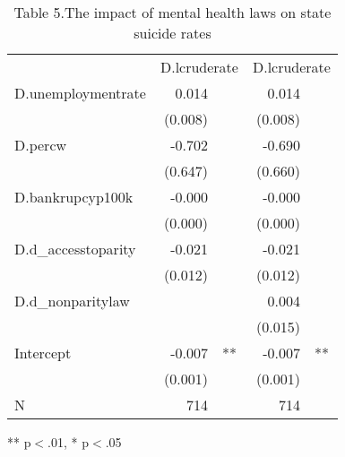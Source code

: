 \documentclass{article}
\begin{document}
\begin{table}[!h]
\caption{Table 5.The impact of mental health laws on state suicide rates}
\centering
\begin{tabular}{lllll}
\cline{1-5}
\multicolumn{1}{r}{} &
  \multicolumn{2}{c}{D.lcruderate} &
  \multicolumn{2}{c}{D.lcruderate} \\
\cline{1-5}
\multicolumn{1}{l}{D.unemploymentrate} &
  \multicolumn{1}{r}{0.014} &
  \multicolumn{1}{l}{} &
  \multicolumn{1}{r}{0.014} &
  \multicolumn{1}{l}{} \\
\multicolumn{1}{l}{} &
  \multicolumn{1}{r}{(0.008)} &
  \multicolumn{1}{l}{} &
  \multicolumn{1}{r}{(0.008)} &
  \multicolumn{1}{l}{} \\
\multicolumn{1}{l}{D.percw} &
  \multicolumn{1}{r}{-0.702} &
  \multicolumn{1}{l}{} &
  \multicolumn{1}{r}{-0.690} &
  \multicolumn{1}{l}{} \\
\multicolumn{1}{l}{} &
  \multicolumn{1}{r}{(0.647)} &
  \multicolumn{1}{l}{} &
  \multicolumn{1}{r}{(0.660)} &
  \multicolumn{1}{l}{} \\
\multicolumn{1}{l}{D.bankrupcyp100k} &
  \multicolumn{1}{r}{-0.000} &
  \multicolumn{1}{l}{} &
  \multicolumn{1}{r}{-0.000} &
  \multicolumn{1}{l}{} \\
\multicolumn{1}{l}{} &
  \multicolumn{1}{r}{(0.000)} &
  \multicolumn{1}{l}{} &
  \multicolumn{1}{r}{(0.000)} &
  \multicolumn{1}{l}{} \\
\multicolumn{1}{l}{D.d\_accesstoparity} &
  \multicolumn{1}{r}{-0.021} &
  \multicolumn{1}{l}{} &
  \multicolumn{1}{r}{-0.021} &
  \multicolumn{1}{l}{} \\
\multicolumn{1}{l}{} &
  \multicolumn{1}{r}{(0.012)} &
  \multicolumn{1}{l}{} &
  \multicolumn{1}{r}{(0.012)} &
  \multicolumn{1}{l}{} \\
\multicolumn{1}{l}{D.d\_nonparitylaw} &
  \multicolumn{1}{r}{} &
  \multicolumn{1}{l}{} &
  \multicolumn{1}{r}{0.004} &
  \multicolumn{1}{l}{} \\
\multicolumn{1}{l}{} &
  \multicolumn{1}{r}{} &
  \multicolumn{1}{l}{} &
  \multicolumn{1}{r}{(0.015)} &
  \multicolumn{1}{l}{} \\
\multicolumn{1}{l}{Intercept} &
  \multicolumn{1}{r}{-0.007} &
  \multicolumn{1}{l}{**} &
  \multicolumn{1}{r}{-0.007} &
  \multicolumn{1}{l}{**} \\
\multicolumn{1}{l}{} &
  \multicolumn{1}{r}{(0.001)} &
  \multicolumn{1}{l}{} &
  \multicolumn{1}{r}{(0.001)} &
  \multicolumn{1}{l}{} \\
\multicolumn{1}{l}{N} &
  \multicolumn{1}{r}{714} &
  \multicolumn{1}{l}{} &
  \multicolumn{1}{r}{714} &
  \multicolumn{1}{l}{} \\
\cline{1-5}
\end{tabular}

\footnotesize{
** p$<$.01, * p$<$.05
}
\end{table}
\end{document}
